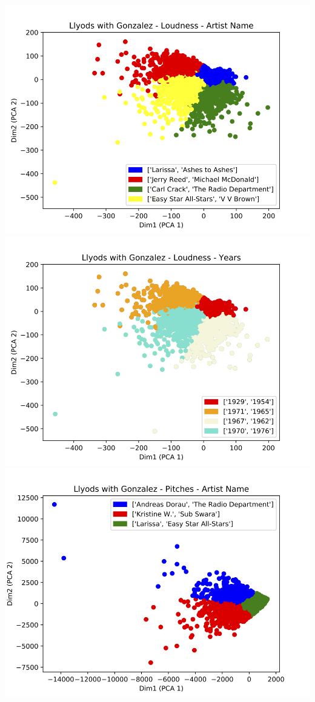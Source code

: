 \documentclass[11pt]{article}
\begin{document}
\begin{center}
\includegraphics[scale=0.3]{assests/fig1.png}
\includegraphics[scale=0.3]{assests/fig2.png}
\includegraphics[scale=0.3]{assests/fig3.png}

\end{center}
\end{document}
